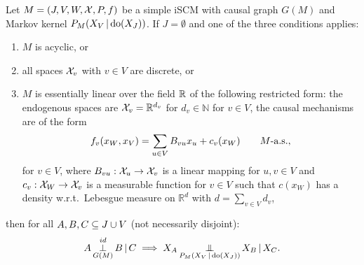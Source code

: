 \begin{Prp}\label{prp:when_d-separation_holds}
  Let $M = \left ( J, V, W, \mathcal{X}, P, f \right )$ be a simple iSCM with causal graph $G(M)$ and Markov kernel $P_{M}(X_V \operatorname*{|} \operatorname{do}(X_J))$.
  If $J = \emptyset$ and one of the three conditions applies:
  \begin{enumerate}
    \item $M$ is acyclic, or
    \item all spaces $\mathcal{X}_v$ with $v \in V$ are discrete, or
    \item %
      $M$ is essentially linear over the field $\mathbb{R}$ of the following restricted form:
      the endogenous spaces are $\mathcal{X}_v = \mathbb{R}^{d_v}$ for $d_v \in \mathbb{N}$ for $v \in V$,
      the causal mechanisms are of the form
      $$
        f_v(x_W,x_V) = \sum_{u\in V} B_{vu} x_u + c_v(x_W) \qquad M\text{-a.s.},
      $$
      for $v \in V$, where $B_{vu} : \mathcal{X}_u \to \mathcal{X}_v$ is a linear mapping for $u,v \in V$ and $c_v : \mathcal{X}_W \to \mathcal{X}_v$ is a measurable function for $v \in V$
      such that $c(x_W)$ has a density w.r.t.\ Lebesgue measure on $\mathbb{R}^d$ with $d = \sum_{v \in V} d_v$,
  \end{enumerate} 
  then for all $A, B, C \subseteq J \cup V$ (not necessarily disjoint):
  $$A \operatorname*{\perp}^{id}_{G(M)} B \operatorname*{|} C \implies X_A \operatorname*{\perp\mkern-11mu\perp}_{P_{M}(X_V \operatorname*{|} \operatorname{do}(X_{J}))} X_B \operatorname*{|} X_C.$$
\end{Prp}
